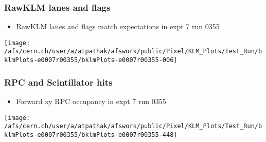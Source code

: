\documentclass{beamer}
\begin{document}
\begin{frame}
\frametitle{RawKLM lanes and flags}
\vspace*{.05cm}

\begin{itemize} 
\item {\small RawKLM lanes and flags match expectations in expt 7 run 0355}
\end{itemize}

\begin{center}
\begin{normalsize}

\vspace*{-.2cm}
\begin{center}

\texttt{[image: /afs/cern.ch/user/a/atpathak/afswork/public/Pixel/KLM\_Plots/Test\_Run/bklmPlots-e0007r00355/bklmPlots-e0007r00355-006]}\\
\end{center}
\end{normalsize}
\end{center}
\end{frame}
\begin{frame}
\frametitle{RPC and Scintillator hits}
\vspace*{.05cm}

\begin{itemize} 
\item {\small Forward xy RPC occupancy in expt 7 run 0355}
\end{itemize}

\begin{center}
\begin{normalsize}

\vspace*{-.2cm}
\begin{center}

\texttt{[image: /afs/cern.ch/user/a/atpathak/afswork/public/Pixel/KLM\_Plots/Test\_Run/bklmPlots-e0007r00355/bklmPlots-e0007r00355-448]}\\
\end{center}
\end{normalsize}
\end{center}
\end{frame}
\end{document}
